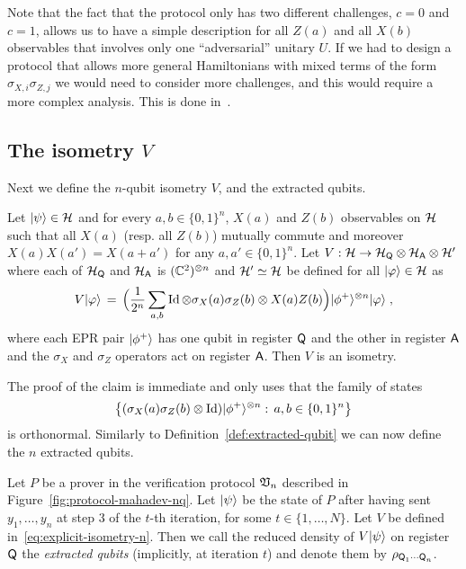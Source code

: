 \begin{remark}\label{rk:mixed-terms}
Note that the fact that the protocol only has two different challenges, $c=0$ and $c=1$, allows us to have a simple description for all $Z(a)$ and all $X(b)$ observables that involves only one ``adversarial'' unitary $U$. If we had to design a protocol that allows more general Hamiltonians with mixed terms of the form $\sigma_{X,i}\sigma_{Z,j}$ we would need to consider more challenges, and this would require a more complex analysis. This is done in~\cite{mahadev2018classical}.
\end{remark}


\subsection{The isometry $V$}

Next we define the $n$-qubit isometry $V$, and the extracted qubits. 

\begin{claim}\label{claim:iso-xz-n1}
Let $|\psi\rangle \in \mathcal{H}$ and for every $a,b\in\{0,1\}^n$, $X(a)$ and $Z(b)$ observables on $\mathcal{H}$ such that all $X(a)$ (resp. all $Z(b)$) mutually commute and moreover $X(a)X(a')=X(a+a')$ for any $a,a'\in\{0,1\}^n$. Let $V: \mathcal{H} \to \mathcal{H}_{\textsf{Q}} \otimes \mathcal{H}_{\textsf{A}} \otimes \mathcal{H}'$ where each of $\mathcal{H}_{\textsf{Q}}$ and $\mathcal{H}_{\textsf{A}}$ is $(\mathbb{C}^2)^{\otimes n}$ and $\mathcal{H}'\simeq \mathcal{H}$ be defined for all $|\varphi\rangle \in \mathcal{H}$ as
\begin{equation}\label{eq:explicit-isometry-n}
V|\varphi\rangle\,=\, \Big(\frac{1}{2^n} \sum_{a,b} \mathop{\rm Id}\nolimits\otimes  \sigma_X(a)\sigma_Z(b)\otimes X(a)Z(b) \Big)|\phi^+\rangle^{\otimes n} |\varphi\rangle \;,
\end{equation} 
where each EPR pair $|\phi^+\rangle$ has one qubit in register ${\textsf{Q}}$ and the other in register ${\textsf{A}}$ and the $\sigma_X$ and $\sigma_Z$ operators act on register ${\textsf{A}}$. Then $V$ is an isometry.
\end{claim}

The proof of the claim is immediate and only uses that the family of states 
\[\big\{ (\sigma_X(a)\sigma_Z(b)\otimes \mathop{\rm Id}\nolimits ) |\phi^+\rangle^{\otimes n} :\, a,b\in\{0,1\}^n\big\}\]
is orthonormal. Similarly to Definition~\ref{def:extracted-qubit} we can now define the $n$ extracted qubits. 

\begin{definition}\label{def:extracted-qubit-n}
Let $P$ be a prover in the verification protocol $\mathfrak{V}_n$ described in Figure~\ref{fig:protocol-mahadev-nq}. Let $|\psi\rangle$ be the state of $P$ after having sent $y_1,\ldots,y_n$ at step 3 of the $t$-th iteration, for some $t\in\{1,\ldots,N\}$. Let $V$ be defined in~\eqref{eq:explicit-isometry-n}. Then we call the reduced density of $V|\psi\rangle$ on register ${\textsf{Q}}$ the \emph{extracted qubits} (implicitly, at iteration $t$) and denote them by $\rho_{{\textsf{Q}}_1\cdots{\textsf{Q}}_n}$. 
\end{definition}



